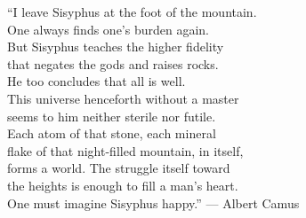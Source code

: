 ``I leave Sisyphus at the foot of the mountain. \\
One always finds one's burden again.\\ 
But Sisyphus teaches the higher fidelity \\
that negates the gods and raises rocks. \\
He too concludes that all is well. \\
This universe henceforth without a master \\
seems to him neither sterile nor futile. \\
Each atom of that stone, each mineral \\
flake of that night-filled mountain, in itself,\\
forms a world. The struggle itself toward \\
the heights is enough to fill a man's heart.\\
One must imagine Sisyphus happy.''
\footnotesize
--- Albert Camus

